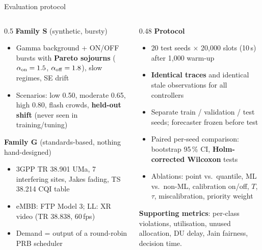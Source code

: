 \documentclass[aspectratio=169,11pt,xcolor=table]{beamer}
\begin{document}
\begin{frame}{Evaluation protocol}
  \begin{columns}[T]
    \begin{column}{0.5\textwidth}
      \textbf{Family S} (synthetic, bursty)
      \begin{itemize}\small
        \item Gamma background + ON/OFF bursts with \textbf{Pareto sojourns} ($\alpha_{\rm on}=1.5$, $\alpha_{\rm off}=1.8$), slow regimes, SE drift
        \item Scenarios: low 0.50, moderate 0.65, high 0.80, flash crowds, \textbf{held-out shift} (never seen in training/tuning)
      \end{itemize}
      \textbf{Family G} (standards-based, nothing hand-designed)
      \begin{itemize}\small
        \item 3GPP TR 38.901 UMa, 7 interfering sites, Jakes fading, TS 38.214 CQI table
        \item eMBB: FTP Model 3; LL: XR video (TR 38.838, 60\,fps)
        \item Demand = output of a round-robin PRB scheduler
      \end{itemize}
    \end{column}
    \begin{column}{0.48\textwidth}
      \textbf{Protocol}
      \begin{itemize}\small
        \item 20 test seeds $\times$ 20{,}000 slots (10\,s) after 1{,}000 warm-up
        \item \textbf{Identical traces} and identical stale observations for all controllers
        \item Separate train / validation / test seeds; forecaster frozen before test
        \item Paired per-seed comparison: bootstrap 95\,\% CI, \textbf{Holm-corrected Wilcoxon} tests
        \item Ablations: point vs.\ quantile, ML vs.\ non-ML, calibration on/off, $T$, $\tau$, miscalibration, priority weight
      \end{itemize}
      \textbf{Supporting metrics}: per-class violations, utilisation, unused allocation, DU delay, Jain fairness, decision time.
    \end{column}
  \end{columns}
\end{frame}

\end{document}

